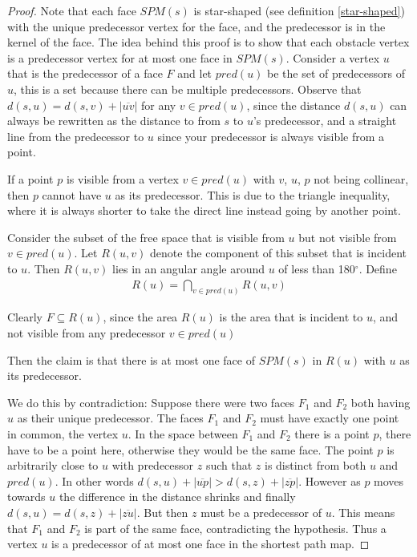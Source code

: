 \begin{proof}
	Note that each face $SPM(s)$ is star-shaped (see definition
	\ref{star-shaped})
	with the unique predecessor vertex for the face, and the predecessor is in
	the kernel of the face.
	The idea behind this proof is to show that each obstacle vertex is a
	predecessor vertex for at most one face in $SPM(s)$.
	Consider a vertex $u$ that is the predecessor of a face $F$ and let
	$pred(u)$ be the set of predecessors of $u$, this is a set because there can
	be multiple predecessors. Observe that $d(s,u)=d(s,v)+|\overline{uv}|$ for
	any $v\in pred(u)$, since the distance $d(s,u)$ can always be rewritten as
	the distance to from $s$ to $u$'s predecessor, and a straight line from the
	predecessor to $u$ since your predecessor is always visible from a point.

	If a point $p$ is visible from a vertex $v \in pred(u)$ with $v$, $u$, $p$ 
    not being collinear, then $p$ cannot have $u$ as its predecessor. This is 
    due to the triangle inequality, where it is always shorter to take the direct 
    line instead going by another point.


	Consider the subset of the free space that is visible from $u$
	but not visible from $v\in pred(u)$. Let $R(u,v)$ denote the component of
	this subset that is incident to $u$. Then $R(u,v)$ lies in an
	angular angle around $u$ of less than 180$^\circ$. Define
	\begin{align}
		R(u) =  \bigcap_{v\in pred(u)} R(u,v)
	\end{align}

	Clearly $F \subseteq R(u)$, since the area $R(u)$ is the area that is
	incident to $u$, and not visible from any predecessor $v\in pred(u)$ 
	
	Then the claim is that there is at most one face of
	$SPM(s)$ in $R(u)$ with $u$ as its predecessor. 
	
	We do this by contradiction: 
	Suppose there were two faces
	$F_1$ and $F_2$ both having $u$ as their unique predecessor. The faces $F_1$
	and $F_2$ must have exactly one point in common, the vertex $u$. In the space
	between $F_1$ and $F_2$ there is a point $p$, there have to be a point here,
	otherwise they would be the same face. The point $p$ is arbitrarily close to $u$ with
	predecessor $z$ such that $z$ is distinct from both $u$ and $pred(u)$. In
	other words $d(s,u)+|\overline{up}|>d(s,z)+|\overline{zp}|$. However as $p$
	moves towards $u$ the difference in the distance shrinks and finally
	$d(s,u) = d(s,z)+|\overline{zu}|$. But then $z$ must be a predecessor of
	$u$. This means that $F_1$ and $F_2$ is part of the same face, contradicting
	the hypothesis. Thus a vertex $u$ is a predecessor of at most one face in
	the shortest path map.


\end{proof}
